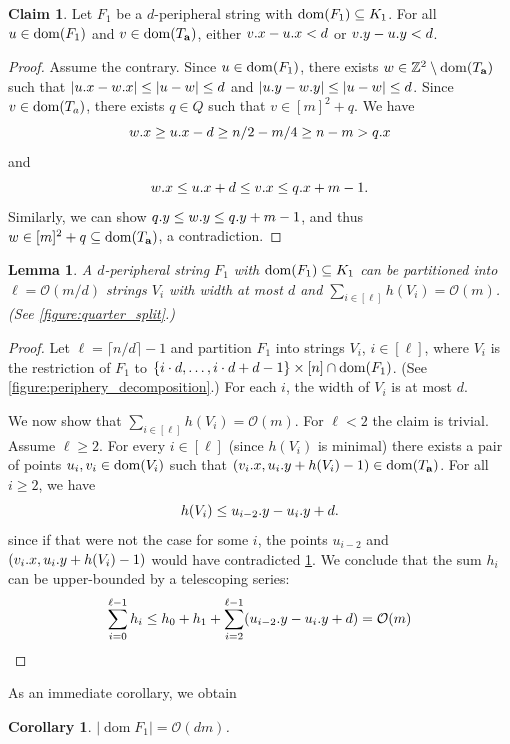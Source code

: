 \documentclass[11pt, letterpaper]{article}
\theoremstyle{plain}
\newtheorem{lemma}{Lemma}
\newtheorem{corollary}[fact]{Corollary}
\theoremstyle{definition}
\newtheorem{claim}{Claim}
\theoremstyle{remark}
\newcommand{\Z}{\mathbb{Z}}
\renewcommand{\O}{\mathcal{O}}
\newcommand{\set}[1]{\left\lbrace #1 \right\rbrace}
\DeclareMathOperator*{\dom}{dom}
\newcommand{\absolute}[1]{\left\lvert#1\right\rvert}
\begin{document}
\begin{claim}\label{border_lemma}
Let $F_1$ be a $d$-peripheral string with $\d{F_1} \subseteq K_1$. For all $u \in \d{F_1}$ and $v \in \d{\Ta}$, either $v.x - u.x < d$ or $v.y - u.y < d$.  
\end{claim}
\begin{proof}
Assume the contrary. Since $u \in \d{F_1}$, there exists $w \in \Z^2 \setminus \d{\Ta}$ such that $\absolute{\x{u} - \x{w}} \le \absolute{u-w} \le d$ and $\absolute{\y{u} - \y{w}} \le \absolute{u-w} \le d$. Since $v \in \d{T_a}$, there exists $q \in Q$ such that $v \in [m]^2 + q$. We have
\[ w.x \ge u.x - d \ge n/2 - m/4 \ge n - m > q.x\]
and
\[ w.x \le u.x + d \le v.x \le q.x + m - 1. \]
Similarly, we can show $q.y \le w.y \le q.y + m - 1$, and thus $w \in [m]^2 + q \subseteq \d{\Ta}$, a contradiction.
\end{proof}

\begin{lemma}\label{lm:partitioning}
A $d$-peripheral string $F_1$ with $\d{F_1} \subseteq K_1$ can be partitioned into $\ell = \O(m/d)$ strings $V_i$ with width at most $d$ and $\sum_{i \in [\ell]} h(V_i) = \O(m)$. (See \cref{figure:quarter_split}.)
\end{lemma}
\begin{proof}
Let $\ell = \lceil n / d \rceil - 1$ and partition $F_1$ into strings $V_i$, $i \in [\ell]$, where $V_i$ is the restriction of $F_1$ to $\set{i \cdot d, \dots, i \cdot d + d - 1} \times [n] \cap \d{F_1}$. (See \cref{figure:periphery_decomposition}.) 
For each $i$, the width of $V_i$ is at most $d$. 

We now show that $\sum_{i \in [\ell]} h(V_i) = \O(m)$. For $\ell < 2$ the claim is trivial. Assume $\ell \ge 2$. For every $i \in [\ell]$ (since $h(V_i)$ is minimal) there exists a pair of points $u_i, v_i \in \d{V_i}$ such that $(\x{v_i}, \y{u_i} + h(V_i) - 1) \in \d{\Ta}$. For all $i \ge 2$, we have
\[ h(V_i) \le u_{i - 2}.y - u_{i}.y + d.\]
since if that were not the case for some $i$, the points $u_{i - 2}$ and $(v_{i}.x, u_{i}.y + h(V_i) - 1)$ would have contradicted \cref{border_lemma}. We conclude that the sum $h_i$ can be upper-bounded by a telescoping series:
%
$$\sum_{i = 0}^{\ell - 1} h_i \le h_0 + h_1 + \sum_{i = 2}^{\ell - 1} (\y{u_{i - 2}} - \y{u_i} + d) = \O(m)$$
\end{proof}

As an immediate corollary, we obtain

\begin{corollary}\label{cor:area_F}
$\absolute{\dom{F_1}} = \O(dm)$. 
\end{corollary}
\end{document}
